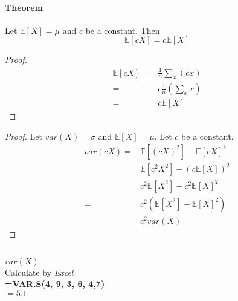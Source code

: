 \documentclass{article}
\begin{document}
            \paragraph{Theorem}
                Let $\mathbb{E}[X]=\mu$ and $c$ be a constant. Then
                $$\mathbb{E}[cX]=c\mathbb{E}[X]$$
                \begin{proof}
                    \begin{align*}
                        \mathbb{E}[cX]=&\frac{1}{n}\sum_{x}(cx)\\
                            =&c\frac{1}{n}(\sum_x x)\\
                            =&c\mathbb{E}[X]
                    \end{align*}
                \end{proof}
                \begin{proof}
                    Let $var(X)=\sigma$ and $\mathbb{E}[X]=\mu$. Let $c$ be a constant.
                    \begin{align*}
                        var(cX)=&\mathbb{E}[(cX)^2]-\mathbb{E}[cX]^2\\
                            =&\mathbb{E}[c^2X^2]-(c\mathbb{E}[X])^2\\
                            =&c^2\mathbb{E}[X^2]-c^2\mathbb{E}[X]^2\\
                            =&c^2(\mathbb{E}[X^2]-\mathbb{E}[X]^2)\\
                            =&c^2var(X)
                    \end{align*}
                \end{proof}
        \subsection{}
            \subsubsection{}
                \paragraph{}
                $var(X)$\\
                Calculate by \textit{Excel}\\
                \textbf{=VAR.S(4, 9, 3, 6, 4,7)} \\$=5.1$\\
            \subsubsection{}
\end{document}
